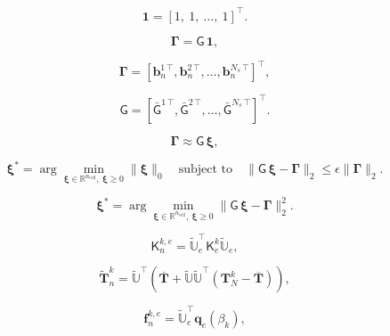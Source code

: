 \documentclass[11pt]{article}
\renewcommand{\vec}[1]{\mathbf{#1}}
\newcommand{\mat}[1]{\mathsf{#1}}
\begin{document}
\begin{equation}
\vec{1} = \left[ 1,\ 1,\ \dots,\ 1 \right]^{\top}.
\end{equation}

\begin{equation}
\boldsymbol{\Gamma} = \mat{G}\, \vec{1},
\label{eq:Gamma_G1}
\end{equation}

\begin{equation}
\boldsymbol{\Gamma} = \left[ \vec{b}_n^{1\,\top}, \vec{b}_n^{2\,\top}, \hdots, \vec{b}_n^{N_s\,\top}\right]^\top,
\end{equation}

\begin{equation}
\mat{G} = \left[ \bar{\mat{G}}^{1\,\top}, \bar{\mat{G}}^{2\,\top}, \hdots, \bar{\mat{G}}^{N_s\,\top}\right]^\top.
\end{equation}

\begin{equation}
\boldsymbol{\Gamma} \approx \mat{G}\, \boldsymbol{\xi},
\label{eq:Gamma_Gxi}
\end{equation}

\begin{equation}
\boldsymbol{\xi}^\ast = \arg \min_{\boldsymbol{\xi} \in \mathbb{R}^{n_{\text{cell}}},\ \boldsymbol{\xi} \geq 0} \| \boldsymbol{\xi} \|_0 \quad \text{subject to} \quad \| \mat{G}\, \boldsymbol{\xi} - \boldsymbol{\Gamma} \|_2 \leq \epsilon \| \boldsymbol{\Gamma} \|_2.
\label{eq:L0_min}
\end{equation}

\begin{equation}
\boldsymbol{\xi}^\ast = \arg \min_{\boldsymbol{\xi} \in \mathbb{R}^{n_{\text{cell}}},\ \boldsymbol{\xi} \geq 0} \| \mat{G}\, \boldsymbol{\xi} - \boldsymbol{\Gamma} \|_2^2.
\label{eq:NNLS}
\end{equation}

\begin{equation}
    \mat{K}^{k,e}_n = \widetilde{\mathbb{U}}_e^{\top} \mat{K}^{k}_e \widetilde{\mathbb{U}}_e,
\end{equation}

\begin{equation}
    \widetilde{\vec{T}}^k_n = \widetilde{\mathbb{U}}^{\top} \left( \overline{\vec{T}} +  \widetilde{\mathbb{U}}\widetilde{\mathbb{U}}^{\top}\left(\vec{T}^{k}_N - \overline{\vec{T}}\right) \right),
    \label{eq:red_snapshot}
\end{equation}

\begin{equation}
    \vec{f}^{k,e}_n = \widetilde{\mathbb{U}}_e^{\top} \vec{q}_e(\beta_k),
\end{equation}
\end{document}
